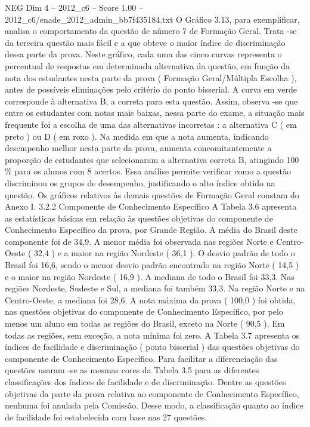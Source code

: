 \begin{textsample}{NEG Dim 4 – 2012\_c6 – Score 1.00 – 2012\_c6/enade\_2012\_admin\_bb7f435184.txt}
O Gráfico 3.13, para exemplificar, analisa o comportamento da questão de número 7 de Formação Geral.
Trata -se da terceira questão mais fácil e a que obteve o maior índice de discriminação dessa parte da prova.
Neste gráfico, cada uma das cinco curvas representa o percentual de respostas em determinada alternativa da questão, em função da nota dos estudantes nesta parte da prova ( Formação Geral/Múltipla Escolha ), antes de possíveis eliminações pelo critério do ponto bisserial.
A curva em verde corresponde à alternativa B, a correta para esta questão.
Assim, observa -se que entre os estudantes com notas mais baixas, nessa parte do exame, a situação mais frequente foi a escolha de uma das alternativas incorretas : a alternativa C ( em preto ) ou D ( em roxo ).
Na medida em que a nota aumenta, indicando desempenho melhor nesta parte da prova, aumenta concomitantemente a proporção de estudantes que selecionaram a alternativa correta B, atingindo 100 \% para os alunos com 8 acertos.
Essa análise permite verificar como a questão discriminou os grupos de desempenho, justificando o alto índice obtido na questão.
Os gráficos relativos às demais questões de Formação Geral constam do Anexo I. 3.2.2 Componente de Conhecimento Específico A Tabela 3.6 apresenta as estatísticas básicas em relação às questões objetivas do componente de Conhecimento Específico da prova, por Grande Região.
A média do Brasil deste componente foi de 34,9.
A menor média foi observada nas regiões Norte e Centro-Oeste ( 32,4 ) e a maior na região Nordeste ( 36,1 ).
O desvio padrão de todo o Brasil foi 16,6, sendo o menor desvio padrão encontrado na região Norte ( 14,5 ) e o maior na região Nordeste ( 16,9 ).
A mediana de todo o Brasil foi 33,3.
Nas regiões Nordeste, Sudeste e Sul, a mediana foi também 33,3.
Na região Norte e na Centro-Oeste, a mediana foi 28,6.
A nota máxima da prova ( 100,0 ) foi obtida, nas questões objetivas do componente de Conhecimento Específico, por pelo menos um aluno em todas as regiões do Brasil, exceto na Norte ( 90,5 ).
Em todas as regiões, sem exceção, a nota mínima foi zero.
A Tabela 3.7 apresenta os índices de facilidade e discriminação ( ponto bisserial ) das questões objetivas do componente de Conhecimento Específico.
Para facilitar a diferenciação das questões usaram -se as mesmas cores da Tabela 3.5 para as diferentes classificações dos índices de facilidade e de discriminação.
Dentre as questões objetivas da parte da prova relativa ao componente de Conhecimento Específico, nenhuma foi anulada pela Comissão.
Desse modo, a classificação quanto ao índice de facilidade foi estabelecida com base nas 27 questões.

\end{textsample}
